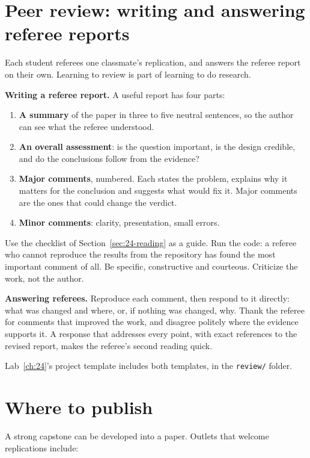 \section{Peer review: writing and answering referee reports}
\label{sec:24-review}

Each student referees one classmate's replication, and answers the referee report on their own. Learning to review is part of learning to do research.

\textbf{Writing a referee report.} A useful report has four parts:

\begin{enumerate}
  \item \textbf{A summary} of the paper in three to five neutral sentences, so the author can see what the referee understood.
  \item \textbf{An overall assessment}: is the question important, is the design credible, and do the conclusions follow from the evidence?
  \item \textbf{Major comments}, numbered. Each states the problem, explains why it matters for the conclusion and suggests what would fix it. Major comments are the ones that could change the verdict.
  \item \textbf{Minor comments}: clarity, presentation, small errors.
\end{enumerate}

Use the checklist of Section~\ref{sec:24-reading} as a guide. Run the code: a referee who cannot reproduce the results from the repository has found the most important comment of all. Be specific, constructive and courteous. Criticize the work, not the author.

\textbf{Answering referees.} Reproduce each comment, then respond to it directly: what was changed and where, or, if nothing was changed, why. Thank the referee for comments that improved the work, and disagree politely where the evidence supports it. A response that addresses every point, with exact references to the revised report, makes the referee's second reading quick.

Lab~\ref{ch:24}'s project template includes both templates, in the \texttt{review/} folder.

\section{Where to publish}
\label{sec:24-publish}

A strong capstone can be developed into a paper. Outlets that welcome replications include:

